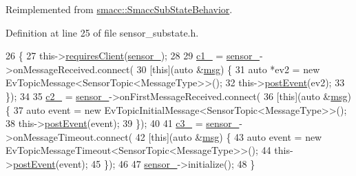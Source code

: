 Reimplemented from \hyperlink{classsmacc_1_1SmaccSubStateBehavior_a7c28e1c46238bbb2c2e0450573c6de94}{smacc\+::\+Smacc\+Sub\+State\+Behavior}.



Definition at line 25 of file sensor\+\_\+substate.\+h.


\begin{DoxyCode}
26   \{
27     this->\hyperlink{classsmacc_1_1SmaccSubStateBehavior_ae8361a9e794b02f9f3d962b881e4fd7d}{requiresClient}(\hyperlink{classsmacc_1_1SensorTopic_a0f51a83e96f6b735033a8474ef1c4191}{sensor\_});
28 
29     \hyperlink{classsmacc_1_1SensorTopic_a3c27b66b1bd8bc850875d95ad5a41041}{c1\_} = \hyperlink{classsmacc_1_1SensorTopic_a0f51a83e96f6b735033a8474ef1c4191}{sensor\_}->onMessageReceived.connect(
30         [\textcolor{keyword}{this}](\textcolor{keyword}{auto} &\hyperlink{namespacekeyboard__node_a768777e12f75b89e4a0a60acf748e9eb}{msg}) \{
31           \textcolor{keyword}{auto} *ev2 = \textcolor{keyword}{new} EvTopicMessage<SensorTopic<MessageType>>();
32           this->\hyperlink{classsmacc_1_1SmaccSubStateBehavior_a8538664f9828247727a27446112788a2}{postEvent}(ev2);
33         \});
34 
35     \hyperlink{classsmacc_1_1SensorTopic_a7d93fd46086bf098cf75a12c27976a8e}{c2\_} = \hyperlink{classsmacc_1_1SensorTopic_a0f51a83e96f6b735033a8474ef1c4191}{sensor\_}->onFirstMessageReceived.connect(
36         [\textcolor{keyword}{this}](\textcolor{keyword}{auto} &\hyperlink{namespacekeyboard__node_a768777e12f75b89e4a0a60acf748e9eb}{msg}) \{
37           \textcolor{keyword}{auto} \textcolor{keyword}{event} = \textcolor{keyword}{new} EvTopicInitialMessage<SensorTopic<MessageType>>();
38           this->\hyperlink{classsmacc_1_1SmaccSubStateBehavior_a8538664f9828247727a27446112788a2}{postEvent}(event);
39         \});
40 
41     \hyperlink{classsmacc_1_1SensorTopic_a2e54533c2a0e0daec10eec3f69ff63d6}{c3\_} = \hyperlink{classsmacc_1_1SensorTopic_a0f51a83e96f6b735033a8474ef1c4191}{sensor\_}->onMessageTimeout.connect(
42         [\textcolor{keyword}{this}](\textcolor{keyword}{auto} &\hyperlink{namespacekeyboard__node_a768777e12f75b89e4a0a60acf748e9eb}{msg}) \{
43           \textcolor{keyword}{auto} \textcolor{keyword}{event} = \textcolor{keyword}{new} EvTopicMessageTimeout<SensorTopic<MessageType>>();
44           this->\hyperlink{classsmacc_1_1SmaccSubStateBehavior_a8538664f9828247727a27446112788a2}{postEvent}(event);
45         \});
46 
47     \hyperlink{classsmacc_1_1SensorTopic_a0f51a83e96f6b735033a8474ef1c4191}{sensor\_}->initialize();
48   \}
\end{DoxyCode}
